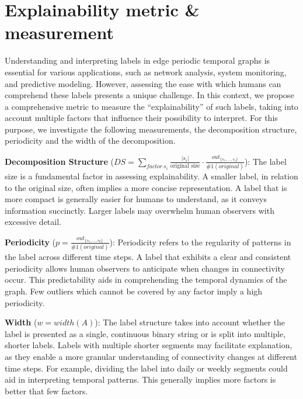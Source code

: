 \chapter{Explainability metric \& measurement}

Understanding and interpreting labels in edge periodic temporal graphs is essential for various applications, such as network analysis, system monitoring, and predictive modeling. However, assessing the ease with which humans can comprehend these labels presents a unique challenge. In this context, we propose a comprehensive metric to measure the \enquote{explainability} of such labels, taking into account multiple factors that influence their possibility to interpret. For this purpose, we investigate the following measurements, the decomposition structure, periodicity and the width of the decomposition.

\textbf{Decomposition Structure} ($DS = \sum\limits_{factor~ s_i}\frac{|s_i|}{\text{original size}} \cdot \frac{out_{\{s_1,\dots,s_i\}}}{\#1(original)}$): The label size is a fundamental factor in assessing explainability. A smaller label, in relation to the original size, often implies a more concise representation. A label that is more compact is generally easier for humans to understand, as it conveys information succinctly. Larger labels may overwhelm human observers with excessive detail.

\textbf{Periodicity} ($p = \frac{out_{\{s_1,\dots,s_k\}}}{\#1(original)}$): Periodicity refers to the regularity of patterns in the label across different time steps. A label that exhibits a clear and consistent periodicity allows human observers to anticipate when changes in connectivity occur. This predictability aids in comprehending the temporal dynamics of the graph. Few outliers which cannot be covered by any factor imply a high periodicity.

\textbf{Width} ($w = width(A)$): The label structure takes into account whether the label is presented as a single, continuous binary string or is split into multiple, shorter labels. Labels with multiple shorter segments may facilitate explanation, as they enable a more granular understanding of connectivity changes at different time steps. For example, dividing the label into daily or weekly segments could aid in interpreting temporal patterns. This generally implies more factors is better that few factors.

